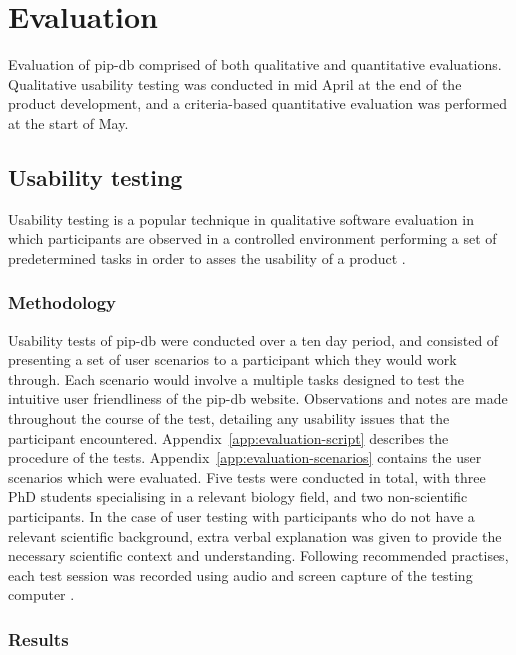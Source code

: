 \chapter{Evaluation}\label{chap:evaluation}

Evaluation of pip-db comprised of both qualitative and quantitative
evaluations. Qualitative usability testing was conducted in mid April
at the end of the product development, and a criteria-based
quantitative evaluation was performed at the start of May.

\section{Usability testing}\label{sec:usability-testing}

Usability testing is a popular technique in qualitative software
evaluation in which participants are observed in a controlled
environment performing a set of predetermined tasks in order to asses
the usability of a product \cite{rubin2008handbook}.

\subsection{Methodology}

Usability tests of pip-db were conducted over a ten day period, and
consisted of presenting a set of user scenarios to a participant which
they would work through. Each scenario would involve a multiple tasks
designed to test the intuitive user friendliness of the pip-db
website. Observations and notes are made throughout the course of the
test, detailing any usability issues that the participant encountered.
Appendix~\ref{app:evaluation-script} describes the procedure of the
tests. Appendix~\ref{app:evaluation-scenarios} contains the user
scenarios which were evaluated. Five tests were conducted in total,
with three PhD students specialising in a relevant biology field, and
two non-scientific participants. In the case of user testing with
participants who do not have a relevant scientific background, extra
verbal explanation was given to provide the necessary scientific
context and understanding. Following recommended practises, each test
session was recorded using audio and screen capture of the testing
computer \cite{dumas1999practical}.

\subsection{Results}

